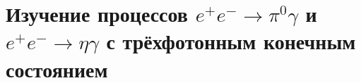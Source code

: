 \section{Изучение процессов $e^+ e^- \to \pi^0 \gamma$ и $e^+ e^- \to \eta \gamma$ с трёхфотонным конечным состоянием}











% 